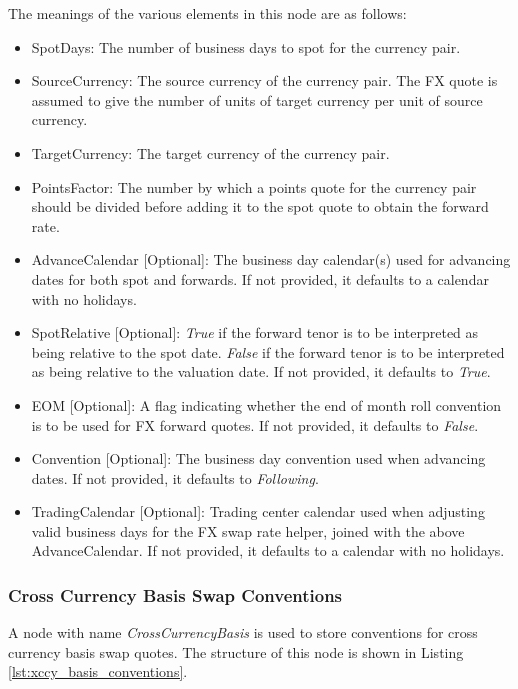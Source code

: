 The meanings of the various elements in this node are as follows:
\begin{itemize}
\item SpotDays: The number of business days to spot for the currency pair.
\item SourceCurrency: The source currency of the currency pair. The FX quote is assumed to give the number of units of
target currency per unit of source currency.
\item TargetCurrency: The target currency of the currency pair.
\item PointsFactor: The number by which a points quote for the currency pair should be divided before adding it to the
spot quote to obtain the forward rate.
\item AdvanceCalendar [Optional]: The business day calendar(s) used for advancing dates for both spot and forwards. If
not provided, it defaults to a calendar with no holidays.
\item SpotRelative [Optional]: \emph{True} if the forward tenor is to be interpreted as being relative to the spot date.
\emph{False} if the forward tenor is to be interpreted as being relative to the valuation date. If not provided, it
defaults to \emph{True}.
\item EOM [Optional]: A flag indicating whether the end of month roll convention is to be used for FX forward quotes. If not provided, it defaults to \emph{False}.
\item Convention [Optional]: The business day convention used when advancing dates. If not provided, it defaults to \emph{Following}.
\item TradingCalendar [Optional]: Trading center calendar used when adjusting valid business days for the FX swap rate helper, joined with the above AdvanceCalendar. If
not provided, it defaults to a calendar with no holidays.
\end{itemize}

\subsubsection{Cross Currency Basis Swap Conventions}
A node with name \emph{CrossCurrencyBasis} is used to store conventions for cross currency basis swap quotes. The
structure of this node is shown in Listing \ref{lst:xccy_basis_conventions}.

